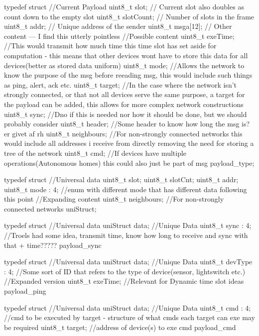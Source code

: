typedef struct {
    //Current Payload
    uint8_t  slot;      // Current slot also doubles as count down to the empty slot
    uint8_t  slotCount; // Number of slots in the frame
    uint8_t  addr;      // Unique address of the sender
    uint8_t  msga[12];  // Other content --- I find this utterly pointless
    //Possible content
    uint8_t exeTime;    //This would transmit how much time this time slot has set aside for computation - this means that other devices wont have to store this data for all devices(better as stored data uniform)
    uint8_t mode;       //Allows the network to know the purpose of the msg before reeading msg, this would include such things as ping, alert, ack etc.
    uint8_t target;     //In the case where the network isn't strongly connected, or that not all devices serve the same purpose, a target for the payload can be added, this allows for more complex network constructions
    uint8_t sync;       //Dno if this is needed nor how it should be done, but we should probably consider
    uint8_t header;     //Some header to know how long the msg is? er givet af rh
    uint8_t neighbours; //For non-strongly connected networks this would include all addresses i receive from directly removing the need for storing a tree of the network
    uint8_t cmd;        //If devices have multiple operations(Autonomous homes) this could also just be part of msg
} payload_type; 

typedef struct {
    //Universal data
    uint8_t slot;
    uint8_t slotCnt;
    uint8_t addr;
    uint8_t mode : 4;       //enum with different mode that has different data following this point
    //Expanding content
    uint8_t neighbours;     //For non-strongly connected networks
} uniStruct;


typedef struct { 
    //Universal data
    uniStruct data;
    //Unique Data      
    uint8_t sync : 4;       //Troels had some idea, transmit time, know how long to receive and sync with that + time?????
} payload_sync

typedef struct { 
    //Universal data
    uniStruct data;
    //Unique Data  
    uint8_t devType : 4;    //Some sort of ID that refers to the type of device(sensor, lightswitch etc.)        
    //Expanded version
    uint8_t exeTime;        //Relevant for Dynamic time slot ideas
} payload_ping 

typedef struct { 
    //Universal data
    uniStruct data;
    //Unique Data 
    uint8_t cmd : 4;        //cmd to be executed by target - structure of what cmds each target can exe may be required
    uint8_t target;         //address of device(s) to exe cmd
} payload_cmd

